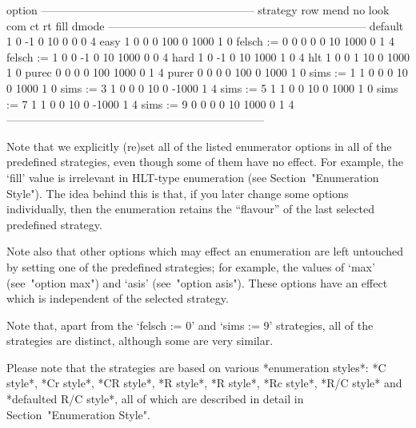 \begintt
                               option
            ---------------------------------------------------------
strategy    row  mend  no  look  com    ct     rt  fill  dmode
---------------------------------------------------------------------
default       1     0  -1     0   10     0      0     0      4
easy          1     0   0     0  100     0   1000     1      0
felsch := 0   0     0   0     0   10  1000      0     1      4
felsch := 1   0     0  -1     0   10  1000      0     0      4
hard          1     0  -1     0   10  1000      1     0      4
hlt           1     0   0     1   10     0   1000     1      0
purec         0     0   0     0  100  1000      0     1      4
purer         0     0   0     0  100     0   1000     1      0
sims := 1     1     0   0     0   10     0   1000     1      0
sims := 3     1     0   0     0   10     0  -1000     1      4
sims := 5     1     1   0     0   10     0   1000     1      0
sims := 7     1     1   0     0   10     0  -1000     1      4
sims := 9     0     0   0     0   10  1000      0     1      4
---------------------------------------------------------------------
\endtt

Note that we explicitly (re)set all of the listed  enumerator  options
in all of the predefined strategies, even though some of them have  no
effect. For example,  the  `fill'  value  is  irrelevant  in  HLT-type
enumeration (see Section~"Enumeration Style"). The idea behind this is
that,  if  you  later  change  some  options  individually,  then  the
enumeration retains the ``flavour'' of the last selected  predefined
strategy.

Note also that other options which may effect an enumeration are  left
untouched by setting one of the predefined  strategies;  for  example,
the values of `max' (see~"option max") and `asis' (see~"option asis").
These options have an effect which  is  independent  of  the  selected
strategy.

Note that, apart from the `felsch := 0' and `sims  :=  9'  strategies,
all of the strategies are distinct, although some are very similar.


Please note that the strategies  are  based  on  various  *enumeration
styles*: *C style*, *Cr style*, *CR style*, *R  style*,  *R\*  style*,
*Rc style*, *R/C style* and *defaulted R/C style*, all  of  which  are
described in detail in Section~"Enumeration Style".

